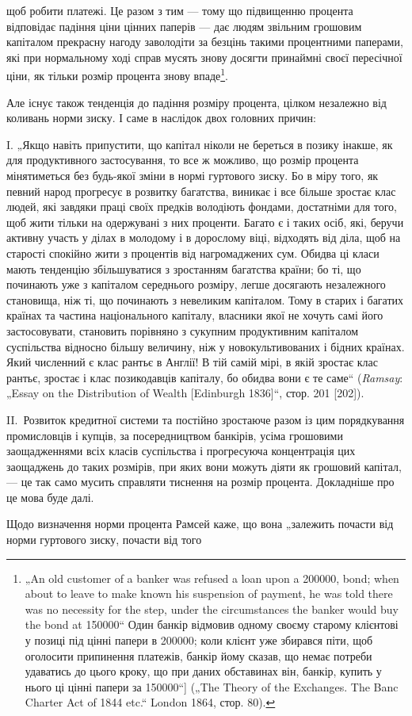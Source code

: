 \parcont{}  %
щоб робити платежі. Це разом з тим — тому що підвищенню процента
відповідає падіння ціни цінних паперів — дає людям звільним
грошовим капіталом прекрасну нагоду заволодіти за безцінь
такими процентними паперами, які при нормальному ході справ
мусять знову досягти принаймні своєї пересічної ціни, як тільки
розмір процента знову впаде\footnote{
„An old customer of a banker was refused a loan upon a \num{200000}, bond;
when about to leave to make known his suspension of payment, he was told
there was no necessity for the step, under the circumstances the banker would buy
the bond at \num{150000}“ Один банкір відмовив одному своєму старому клієнтові
у позиці під цінні папери в \num{200000}; коли клієнт уже збирався
піти, щоб оголосити припинення платежів, банкір йому сказав, що немає потреби
удаватись до цього кроку, що при даних обставинах він, банкір, купить
у нього ці цінні папери за \num{150000}“] („The Theory of the Exchanges.
The Banc Charter Act of 1844 etc.“ London 1864, стор. 80).
}.

Але існує також тенденція до падіння розміру процента, цілком
незалежно від коливань норми зиску. І саме в наслідок
двох головних причин:

I. „Якщо навіть припустити, що капітал ніколи не береться
в позику інакше, як для продуктивного застосування, то все ж
можливо, що розмір процента мінятиметься без будь-якої зміни
в нормі гуртового зиску. Бо в міру того, як певний народ прогресує
в розвитку багатства, виникає і все більше зростає клас
людей, які завдяки праці своїх предків володіють фондами, достатніми
для того, щоб жити тільки на одержувані з них проценти.
Багато є і таких осіб, які, беручи активну участь у ділах в молодому
і в дорослому віці, відходять від діла, щоб на старості
спокійно жити з процентів від нагромаджених сум. Обидва ці
класи мають тенденцію збільшуватися з зростанням багатства
країни; бо ті, що починають уже з капіталом середнього розміру,
легше досягають незалежного становища, ніж ті, що починають
з невеликим капіталом. Тому в старих і багатих країнах
та частина національного капіталу, власники якої не хочуть самі
його застосовувати, становить порівняно з сукупним продуктивним
капіталом суспільства відносно більшу величину, ніж
у новокультивованих і бідних країнах. Який численний є клас
рантьє в Англії! В тій самій мірі, в якій зростає клас рантьє,
зростає і клас позикодавців капіталу, бо обидва вони є те саме“
(\emph{Ramsay}: „Essay on the Distribution of Wealth [Edinburgh 1836]“,
стор. 201 [202]).

II.~Розвиток кредитної системи та постійно зростаюче разом
із цим порядкування промисловців і купців, за посередництвом
банкірів, усіма грошовими заощадженнями всіх класів суспільства
і прогресуюча концентрація цих заощаджень до таких розмірів,
при яких вони можуть діяти як грошовий капітал, — це
так само мусить справляти тиснення на розмір процента.
Докладніше про це мова буде далі.

Щодо визначення норми процента Рамсей каже, що вона „залежить
почасти від норми гуртового зиску, почасти від того
\parbreak{}  %
